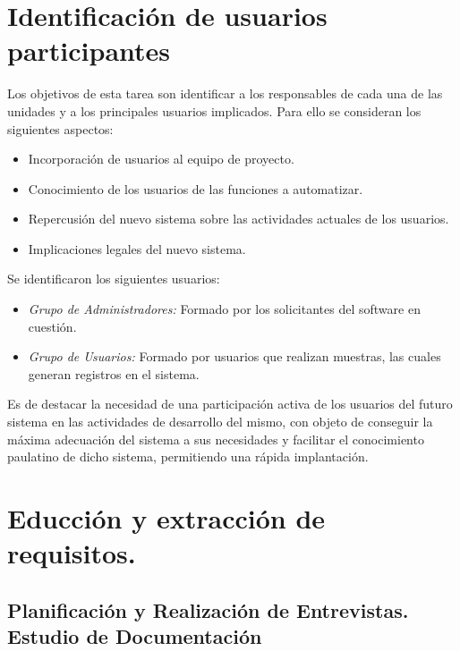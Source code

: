 \section{Identificación de usuarios participantes}

Los objetivos de esta tarea son identificar a los responsables de cada una de las unidades y a los principales usuarios implicados. Para ello se consideran los siguientes aspectos:

\begin{itemize}
    \item Incorporación de usuarios al equipo de proyecto.
    \item Conocimiento de los usuarios de las funciones a automatizar.
    \item Repercusión del nuevo sistema sobre las actividades actuales de los usuarios.
    \item Implicaciones legales del nuevo sistema.
 
\end{itemize}

Se identificaron los siguientes usuarios:

 \begin{itemize}
 
\item \emph{Grupo de Administradores:} Formado por los solicitantes del software en cuestión.
 
\item \emph{Grupo de Usuarios:} Formado por usuarios que realizan muestras, las cuales generan registros en el sistema.

 \end{itemize}
 
 Es de destacar la necesidad de una participación activa de los usuarios del futuro sistema en las actividades de desarrollo del mismo, con objeto de conseguir la máxima adecuación del sistema a sus necesidades y facilitar el conocimiento paulatino de dicho sistema, permitiendo una rápida implantación.

  \section{Educción y extracción de requisitos.}

  \subsection{Planificación y Realización de Entrevistas. Estudio de Documentación}
  
